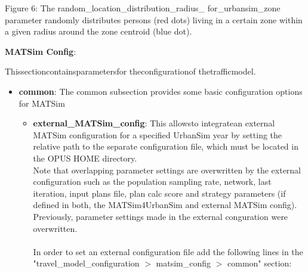 \documentclass[a4paper,11pt]{report}
\begin{document}

Figure 6: The random\_location\_distribution\_radius\_ for\_urbansim\_zone  parameter randomly distributes persons (red dots) living in a certain  zone within a given radius around the zone centroid (blue dot).

\textbf{MATSim Config}:

Thissectioncontainsparametersfor theconfigurationof thetrafficmodel.
\begin{itemize}
	\item \textbf{common}: The common subsection provides some basic configuration options for MATSim   
\begin{itemize}
	\item \textbf{external\_MATSim\_config}: This allowsto integratean external MATSim configuration for a specified UrbanSim year by setting the relative path to the separate configuration file, which must be located in the OPUS HOME directory.
\\Note  that overlapping parameter settings are overwritten by the external  configuration such as the population sampling rate, network, last  iteration, input plans file, plan calc score and strategy parameters (if  defined in both, the MATSim4UrbanSim and external MATSim config).
\\     Previously, parameter settings made in the external conguration were overwritten.
\\
\\     In order to set an external configuration file add the following  lines in the "travel\_model\_configuration $>$ matsim\_config $>$ common"  section:
\\
\begin{verbatim}


\end{verbatim}
\end{itemize}
\end{itemize}
\end{document}
